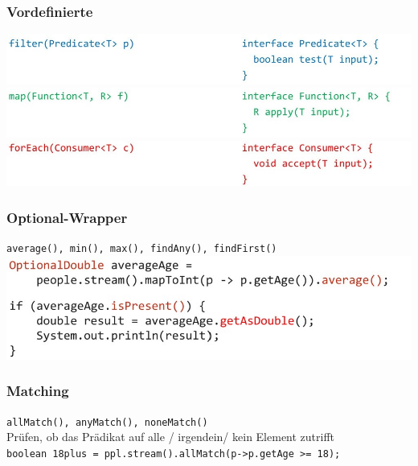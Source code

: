 {    \subsubsection{Vordefinierte}
        \includegraphics[width=0.8\linewidth]{pictures/funktionsschnitt-vordef_1.jpg}
        \includegraphics[width=0.8\linewidth]{pictures/funktionsschnitt-vordef_2.jpg}
        \includegraphics[width=0.8\linewidth]{pictures/funktionsschnitt-vordef_3.jpg}
        \vspace{-0.3cm}

    \subsubsection{Optional-Wrapper}
        \verb|average(), min(), max(), findAny(), findFirst()| \\
        \includegraphics[width=0.8\linewidth]{pictures/optional-wrapper.jpg}
        \vspace{-0.3cm}

    \subsubsection{Matching}
        \verb|allMatch(), anyMatch(), noneMatch()| \\
        Prüfen, ob das Prädikat auf alle / irgendein/ kein Element zutrifft \\
        \verb|boolean 18plus = ppl.stream().allMatch(p->p.getAge >= 18);|
        \vspace{-0.2cm}

}